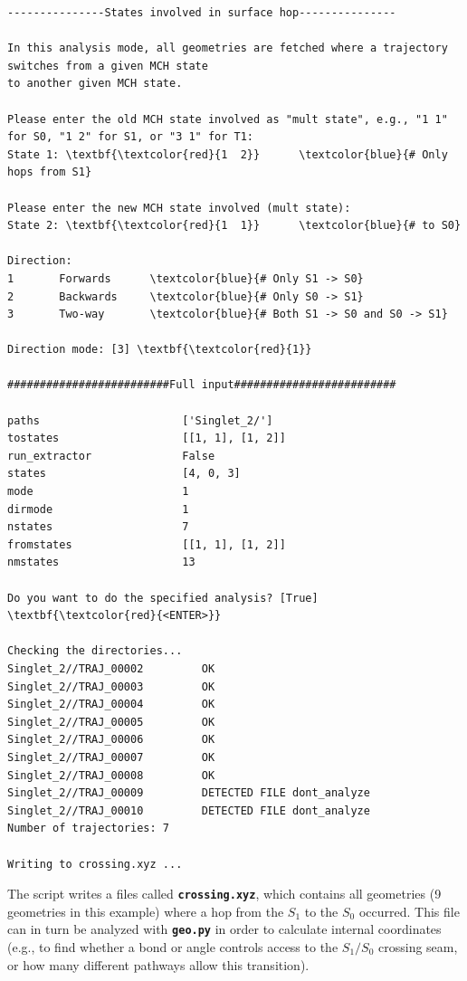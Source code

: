 \documentclass[a4paper,11pt,DIV=15,openany]{scrbook}
\newcommand{\ttt}[1]{\textbf{\texttt{#1}}}
\begin{document}
\begin{oframed}
\begin{Verbatim}[commandchars=\\\{\}]
---------------States involved in surface hop---------------

In this analysis mode, all geometries are fetched where a trajectory switches from a given MCH state
to another given MCH state.

Please enter the old MCH state involved as "mult state", e.g., "1 1" for S0, "1 2" for S1, or "3 1" for T1:
State 1: \textbf{\textcolor{red}{1  2}}      \textcolor{blue}{# Only hops from S1}

Please enter the new MCH state involved (mult state):
State 2: \textbf{\textcolor{red}{1  1}}      \textcolor{blue}{# to S0}

Direction:
1       Forwards      \textcolor{blue}{# Only S1 -> S0}
2       Backwards     \textcolor{blue}{# Only S0 -> S1}
3       Two-way       \textcolor{blue}{# Both S1 -> S0 and S0 -> S1}

Direction mode: [3] \textbf{\textcolor{red}{1}}

#########################Full input#########################

paths                      ['Singlet_2/']
tostates                   [[1, 1], [1, 2]]
run_extractor              False
states                     [4, 0, 3]
mode                       1
dirmode                    1
nstates                    7
fromstates                 [[1, 1], [1, 2]]
nmstates                   13

Do you want to do the specified analysis? [True] \textbf{\textcolor{red}{<ENTER>}}

Checking the directories...
Singlet_2//TRAJ_00002         OK
Singlet_2//TRAJ_00003         OK
Singlet_2//TRAJ_00004         OK
Singlet_2//TRAJ_00005         OK
Singlet_2//TRAJ_00006         OK
Singlet_2//TRAJ_00007         OK
Singlet_2//TRAJ_00008         OK
Singlet_2//TRAJ_00009         DETECTED FILE dont_analyze
Singlet_2//TRAJ_00010         DETECTED FILE dont_analyze
Number of trajectories: 7

Writing to crossing.xyz ...
\end{Verbatim}
\end{oframed}

\normalsize
The script writes a files called \ttt{crossing.xyz}, which contains all geometries (9 geometries in this example) where a hop from the $S_1$ to the $S_0$ occurred.
This file can in turn be analyzed with \ttt{geo.py} in order to calculate internal coordinates (e.g., to find whether a bond or angle controls access to the $S_1/S_0$ crossing seam, or how many different pathways allow this transition). 
\end{document}
